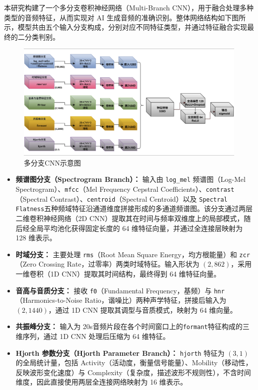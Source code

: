 \documentclass[a4paper,12pt]{article}
\begin{document}
本研究构建了一个多分支卷积神经网络（Multi-Branch CNN），用于融合处理多种类型的音频特征，从而实现对 AI 生成音频的准确识别。整体网络结构如下图所示，模型共由五个输入分支构成，分别对应不同特征类型，并通过特征融合实现最终的二分类判别。

\begin{figure}[h]
    \centering
    \includegraphics[width=0.75\linewidth]{images_in_paper/model.png}
    \caption{多分支CNN示意图}
    \label{fig:model}
\end{figure}

\begin{itemize}
 
  \item \textbf{频谱图分支（Spectrogram Branch）：} 输入由 \texttt{log\_mel} 频谱图（Log-Mel Spectrogram）、\texttt{mfcc}（Mel Frequency Cepstral Coefficients）、\texttt{contrast}（Spectral Contrast）、\texttt{centroid}（Spectral Centroid）以及 \texttt{Spectral Flatness}五种频域特征沿通道维度拼接形成的多通道频谱图。该分支通过两层二维卷积神经网络（2D CNN）提取其在时间与频率双维度上的局部模式，随后经全局平均池化获得固定长度的 64 维特征向量，并通过全连接层映射为 128 维表示。

    \item \textbf{时域分支：} 主要处理 \texttt{rms}（Root Mean Square Energy，均方根能量）和 \texttt{zcr}（Zero Crossing Rate，过零率）两类时域特征。输入形状为 $(2, 862)$，采用一维卷积（1D CNN）提取其时间结构，最终得到 64 维特征向量。
      
    \item \textbf{音高与音质分支：} 接收 \texttt{f0}（Fundamental Frequency，基频）与 \texttt{hnr}（Harmonics-to-Noise Ratio，谐噪比）两种声学特征，拼接后输入为 $(2, 1440)$，通过 1D CNN 提取其调型与音质模式，映射为 64 维向量。
      
    \item \textbf{共振峰分支：} 输入为 20s音频片段在各个时间窗口上的\texttt{formant}特征构成的三维序列，通过 1D CNN 处理后压缩为 64 维特征。
      
    \item \textbf{Hjorth 参数分支（Hjorth Parameter Branch）：} \texttt{hjorth} 特征为 $(3,1)$ 的全局统计量，包括 Activity（活动度，衡量信号能量）、Mobility（移动性，反映波形变化速度）与 Complexity（复杂度，描述波形不规则性），不含时间维度，因此直接使用两层全连接网络映射为 16 维表示。

\end{itemize}
\end{document}
